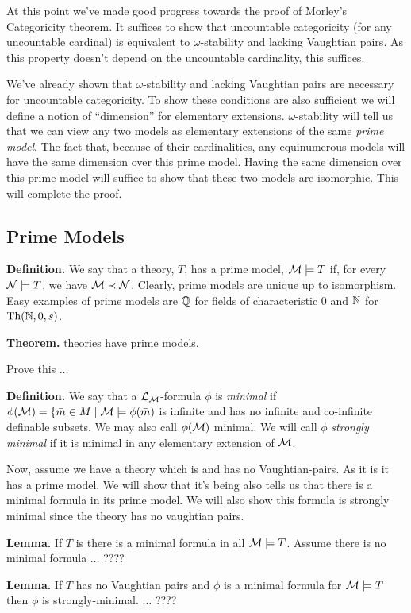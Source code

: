 At this point we've made good progress towards the proof of Morley's Categoricity theorem.
It suffices to show that uncountable categoricity (for any uncountable cardinal) is equivalent to \(\omega\)-stability and lacking Vaughtian pairs.
As this property doesn't depend on the uncountable cardinality, this suffices. 

We've already shown that \(\omega\)-stability and lacking Vaughtian pairs are necessary for uncountable categoricity.
To show these conditions are also sufficient we will define a notion of ``dimension'' for elementary extensions.
\(\omega\)-stability will tell us that we can view any two models as elementary extensions of the same \textit{prime model}.
The fact that, because of their cardinalities, any equinumerous models will have the same dimension over this prime model.
Having the same dimension over this prime model will suffice to show that these two models are isomorphic.
This will complete the proof. 

\subsection{Prime Models}

\textbf{Definition.} We say that a theory, \(T\),  has a prime model, \(\mathcal{M} \models T\) if, for every \(\mathcal{N} \models T\), we have \(\mathcal{M} \prec \mathcal{N}\). 
Clearly, prime models are unique up to isomorphism. Easy examples of prime models are \(\mathbb{Q}\) for fields of characteristic 0 and \(\mathbb{N}\) for \(\text{Th}(\mathbb{N}, 0, s)\). %

\textbf{Theorem.} \omst theories have prime models.
 
{\color{red}Prove this \(\ldots\)}


\textbf{Definition.} We say that a \(\mathcal{L}_{\mathcal{M}}\)-formula \(\phi\) is \textit{minimal} if \(\phi(\mathcal{M}) = \{\bar{m} \in M \mid \mathcal{M} \models \phi(\bar{m})\) is infinite and has no infinite and co-infinite definable subsets. 
We may also call \(\phi(\mathcal{M})\) minimal. 
We will call \(\phi\) %
\textit{strongly minimal} if it is  minimal in any elementary extension of \(\mathcal{M}\).

Now, assume we have a theory which is \omst and has no Vaughtian-pairs. 
As it is \omst it has a prime model.
We will show that it's being \omst also tells us that there is a minimal formula in its prime model.
We will also show this formula is strongly minimal since the theory has no vaughtian pairs. 

\textbf{Lemma.} If \(T\) is \omst there is a minimal formula in all \(\mathcal{M} \models T\).
Assume there is no minimal formula {\color{red}\(\ldots\) ????} %

\textbf{Lemma.} If \(T\) has no Vaughtian pairs and \(\phi\) is a minimal formula for \(\mathcal{M} \models T\) then \(\phi\) is strongly-minimal. 
{\color{red}\(\ldots\) ????} %



